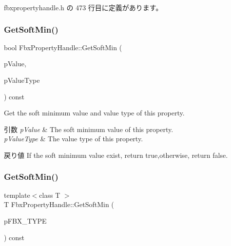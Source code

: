  fbxpropertyhandle.\+h の 473 行目に定義があります。

\mbox{\label{class_fbx_property_handle_a879e886ad129d780a9343def15bead82}} 
\subsubsection{\texorpdfstring{Get\+Soft\+Min()}{GetSoftMin()}\hspace{0.1cm}{\footnotesize\ttfamily [1/2]}}
{\footnotesize\ttfamily bool Fbx\+Property\+Handle\+::\+Get\+Soft\+Min (\begin{DoxyParamCaption}\item[{void $\ast$}]{p\+Value,  }\item[{\hyperlink{fbxpropertytypes_8h_a73913a5ddfb20e57c6f25e9e6784bd92}{E\+Fbx\+Type}}]{p\+Value\+Type }\end{DoxyParamCaption}) const}

Get the soft minimum value and value type of this property. 
\begin{DoxyParams}{引数}
{\em p\+Value} & The soft minimum value of this property. \\
\hline
{\em p\+Value\+Type} & The value type of this property. \\
\hline
\end{DoxyParams}
\begin{DoxyReturn}{戻り値}
If the soft minimum value exist, return true,otherwise, return false. 
\end{DoxyReturn}
\mbox{\label{class_fbx_property_handle_a1f2a64b0088928db88a25dccb7c7d190}} 
\subsubsection{\texorpdfstring{Get\+Soft\+Min()}{GetSoftMin()}\hspace{0.1cm}{\footnotesize\ttfamily [2/2]}}
{\footnotesize\ttfamily template$<$class T $>$ \\
T Fbx\+Property\+Handle\+::\+Get\+Soft\+Min (\begin{DoxyParamCaption}\item[{const T $\ast$}]{p\+F\+B\+X\+\_\+\+T\+Y\+PE }\end{DoxyParamCaption}) const\hspace{0.3cm}{\ttfamily [inline]}}

